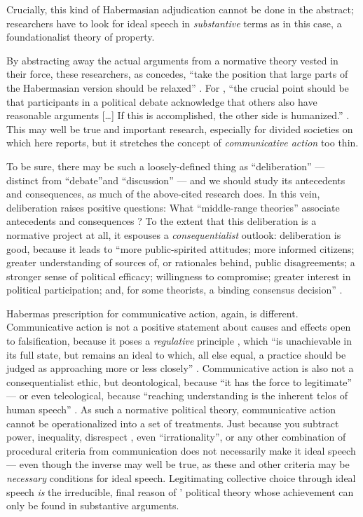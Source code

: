 Crucially, this kind of Habermasian adjudication cannot be done in the abstract; researchers have to look for ideal speech in \emph{substantive} terms as in this case, a foundationalist theory of property.

By abstracting away the actual arguments from a normative theory vested in their force, these researchers, as \citeauthor{Steiner2012} concedes, ``take the position that large parts of the Habermasian version should be relaxed'' \citep[150]{Steiner2012}.
For \citeauthor{Steiner2012}, ``the crucial point should be that participants in a political debate acknowledge that others also have reasonable arguments 
[\ldots]
If this is accomplished, the other side is humanized.'' \citeyearpar[150]{Steiner2012}.
This may well be true and important research, especially for divided societies on which \citeauthor{Steiner2012} here reports, but it stretches the concept of \emph{communicative action} too thin.

To be sure, there may be such a loosely-defined thing as ``deliberation'' --- distinct from ``debate''and ``discussion''  \citep[384]{Landwehr2010} --- and we should study its antecedents and consequences, as much of the above-cited research does.
In this vein, deliberation raises positive questions: What ``middle-range theories'' associate antecedents and consequences \citep{Mutz2008}? 
To the extent that this deliberation is a normative project at all, it espouses a \emph{consequentialist} outlook: deliberation is good, because it leads to ``more public-spirited attitudes; more informed citizens; greater understanding of sources of, or rationales behind, public disagreements; a stronger sense of political efficacy; willingness to compromise; greater interest in political participation; and, for some theorists, a binding consensus decision'' \citep[524]{Mutz2008}.

Habermas prescription for communicative action, again, is different.
Communicative action is not a positive statement about causes and effects open to falsification, because it poses a \emph{regulative} principle \citep{Kant1781}, which ``is unachievable in its full state, but remains an ideal to which, all else equal, a practice should be judged as approaching more or less closely'' \cite[80]{Mansbridge2010a}.
Communicative action is also not a consequentialist ethic, but deontological, because ``it has the force to legitimate'' \citep[147]{Habermas2008} --- or even teleological, because ``reaching understanding is the inherent telos of human speech'' \cite[287]{Habermas-1984-aa}.
As such a normative political theory, communicative action cannot be operationalized into a set of treatments.
Just because you subtract power, inequality, disrespect \citep{Steenbergen2003}, even ``irrationality'', or any other combination of procedural criteria from communication  does not necessarily make it ideal speech --- even though the inverse may well be true, as these and other criteria may be \emph{necessary} conditions for ideal speech.
Legitimating collective choice through ideal speech \emph{is} the irreducible, final reason of \citeauthor{Habermas-1984-aa}' political theory whose achievement can only be found in substantive arguments.

